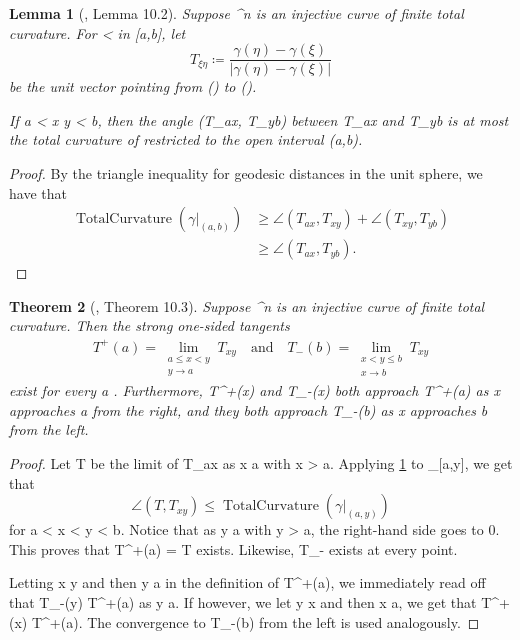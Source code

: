 \documentclass[a4paper, 11pt]{article}
\theoremstyle{plain}
\newtheorem{theorem}{Theorem}[section]
\newtheorem{lemma}[theorem]{Lemma}
\theoremstyle{definition}
\theoremstyle{remark}
\numberwithin{equation}{subsection}
\def\({}
\def\){}
\begin{document}
\begin{lemma}[{\cite{EWW02}, Lemma 10.2}]
\label{Existence of Strong One-sided Tangents}
Suppose \(\gamma \vcentcolon [a,b] \rightarrow {}^{n}\) is an injective curve of finite total curvature. For \(\xi < \eta\) in \([a,b]\), let
\[T_{\xi \eta} \coloneq \frac{\gamma(\eta) - \gamma(\xi)}{|\gamma(\eta) - \gamma(\xi)|}\]
be the unit vector pointing from \(\gamma(\xi)\) to \(\gamma(\eta)\).

If \(a < x \leqslant y < b\), then the angle \(\angle(T_{ax}, T_{yb})\) between \(T_{ax}\) and \(T_{yb}\) is at most the total curvature of \(\gamma\) restricted to the open interval \((a,b)\).
\end{lemma}

\begin{proof}
By the triangle inequality for geodesic distances in the unit sphere, we have that
\begin{align*}
\operatorname{TotalCurvature}(\gamma\vert_{(a,b)}) &\geqslant \angle(T_{ax}, T_{xy}) + \angle(T_{xy}, T_{yb}) \\
&\geqslant \angle(T_{ax}, T_{yb}).
\end{align*}
\end{proof}

\begin{theorem}[{\cite{EWW02}, Theorem 10.3}]
Suppose \(\gamma \vcentcolon [A,B] \rightarrow {}^{n}\) is an injective curve of finite total curvature. Then the strong one-sided tangents
\begin{gather}
T^{+}(a) = \lim_{\substack{a \leqslant x < y \\ y \rightarrow a}} T_{xy} \quad \text{and} \quad T_{-}(b) = \lim_{\substack{x < y \leqslant b \\ x \rightarrow b}} T_{xy}
\end{gather}
exist for every \(a \in [A, B)\) and every \(b \in (A,B]\). Furthermore, \(T^{+}(x)\) and \(T_{-}(x)\) both approach \(T^{+}(a)\) as \(x\) approaches \(a\) from the right, and they both approach \(T_{-}(b)\) as \(x\) approaches \(b\) from the left.
\end{theorem}

\begin{proof}
Let \(T\) be the limit of \(T_{ax}\) as \(x \rightarrow a\) with \(x > a\). Applying \cref{Existence of Strong One-sided Tangents} to \(\gamma \vert_{[a,y]}\), we get that
\begin{equation}
\angle(T, T_{xy}) \leqslant \operatorname{TotalCurvature}(\gamma \vert_{(a,y)})
\end{equation}
for \(a < x < y < b\). Notice that as \(y \rightarrow a\) with \(y > a\), the right-hand side goes to \(0\). This proves that \(T^{+}(a) = T\) exists. Likewise, \(T_{-}\) exists at every point.

Letting \(x \rightarrow y\) and then \(y \rightarrow a\) in the definition of \(T^{+}(a)\), we immediately read off that \(T_{-}(y) \rightarrow T^{+}(a)\) as \(y \rightarrow a\). If however, we let \(y \rightarrow x\) and then \(x \rightarrow a\), we get that \(T^{+}(x) \rightarrow T^{+}(a)\). The convergence to \(T_{-}(b)\) from the left is used analogously.
\end{proof}


\clearpage

\nocite{*}
\end{document}
